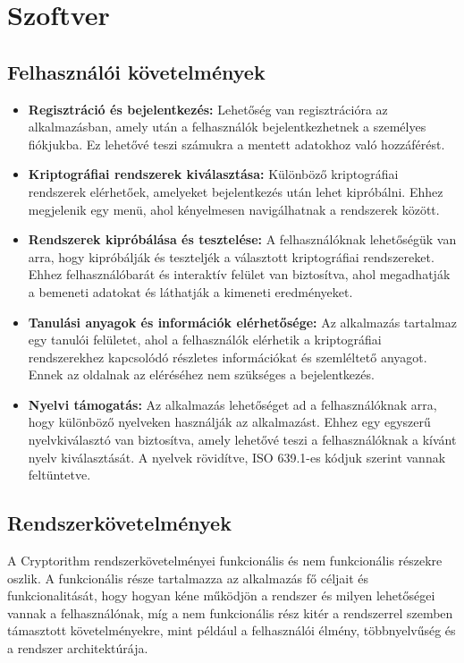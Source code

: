 \chapter{Szoftver}

\section{Felhasználói követelmények}

\begin{itemize}
	\item\textbf{Regisztráció és bejelentkezés:} Lehetőség van regisztrációra az alkalmazásban, amely után a felhasználók bejelentkezhetnek a személyes fiókjukba. Ez lehetővé teszi számukra a mentett adatokhoz való hozzáférést.

	\item\textbf{Kriptográfiai rendszerek kiválasztása:} Különböző kriptográfiai rendszerek elérhetőek, amelyeket bejelentkezés után lehet kipróbálni. Ehhez megjelenik egy menü, ahol kényelmesen navigálhatnak a rendszerek között.

	\item\textbf{Rendszerek kipróbálása és tesztelése:} A felhasználóknak lehetőségük van arra, hogy kipróbálják és teszteljék a választott kriptográfiai rendszereket. Ehhez felhasználóbarát és interaktív felület van biztosítva, ahol megadhatják a bemeneti adatokat és láthatják a kimeneti eredményeket.

	\item\textbf{Tanulási anyagok és információk elérhetősége:} Az alkalmazás tartalmaz egy tanulói felületet, ahol a felhasználók elérhetik a kriptográfiai rendszerekhez kapcsolódó részletes információkat és szemléltető anyagot. Ennek az oldalnak az eléréséhez nem szükséges a bejelentkezés.

	\item\textbf{Nyelvi támogatás:} Az alkalmazás lehetőséget ad a felhasználóknak arra, hogy különböző nyelveken használják az alkalmazást. Ehhez egy egyszerű nyelvkiválasztó van biztosítva, amely lehetővé teszi a felhasználóknak a kívánt nyelv kiválasztását. A nyelvek rövidítve, ISO 639.1-es kódjuk szerint vannak feltüntetve.
\end{itemize}

\newpage
\section{Rendszerkövetelmények}
A Cryptorithm rendszerkövetelményei funkcionális és nem funkcionális részekre oszlik. A funkcionális része tartalmazza az alkalmazás fő céljait és funkcionalitását, hogy hogyan kéne működjön a rendszer és milyen lehetőségei vannak a felhasználónak, míg a nem funkcionális rész kitér a rendszerrel szemben támasztott követelményekre, mint például a felhasználói élmény, többnyelvűség és a rendszer architektúrája.

